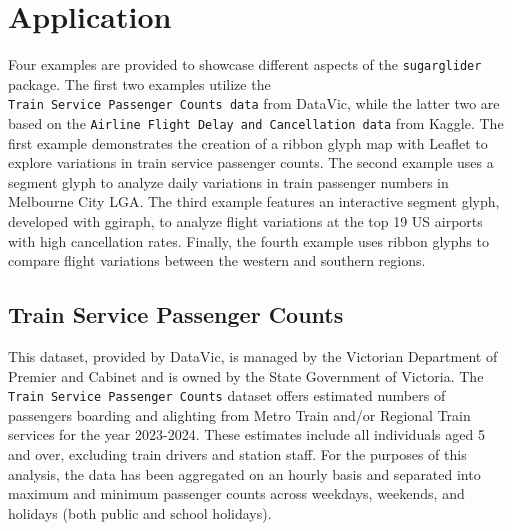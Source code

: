 \hypertarget{application}{%
\section{Application}\label{application}}

Four examples are provided to showcase different aspects of the \texttt{sugarglider} package. The first two examples utilize the \texttt{Train\ Service\ Passenger\ Counts\ data} from DataVic, while the latter two are based on the \texttt{Airline\ Flight\ Delay\ and\ Cancellation\ data} from Kaggle. The first example demonstrates the creation of a ribbon glyph map with Leaflet to explore variations in train service passenger counts. The second example uses a segment glyph to analyze daily variations in train passenger numbers in Melbourne City LGA. The third example features an interactive segment glyph, developed with ggiraph, to analyze flight variations at the top 19 US airports with high cancellation rates. Finally, the fourth example uses ribbon glyphs to compare flight variations between the western and southern regions.

\hypertarget{train-service-passenger-counts}{%
\subsection{Train Service Passenger Counts}\label{train-service-passenger-counts}}

This dataset, provided by DataVic, is managed by the Victorian Department of Premier and Cabinet and is owned by the State Government of Victoria. The \texttt{Train\ Service\ Passenger\ Counts} dataset offers estimated numbers of passengers boarding and alighting from Metro Train and/or Regional Train services for the year 2023-2024. These estimates include all individuals aged 5 and over, excluding train drivers and station staff. For the purposes of this analysis, the data has been aggregated on an hourly basis and separated into maximum and minimum passenger counts across weekdays, weekends, and holidays (both public and school holidays).

